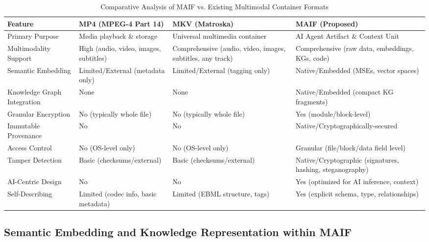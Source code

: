 \documentclass[conference]{IEEEtran}
\begin{document}
\begin{table*}[!t]
\renewcommand{\arraystretch}{1.3}
\caption{Comparative Analysis of MAIF vs. Existing Multimodal Container Formats}
\label{tab:maif-comparison}
\centering
\scriptsize
\begin{tabular}{p{3cm}p{3.5cm}p{3.5cm}p{3.5cm}}
\toprule
\textbf{Feature} & \textbf{MP4 (MPEG-4 Part 14)} & \textbf{MKV (Matroska)} & \textbf{MAIF (Proposed)} \\
\midrule
Primary Purpose & Media playback \& storage\cite{ref35} & Universal multimedia container\cite{ref37} & AI Agent Artifact \& Context Unit \\
Multimodality Support & High (audio, video, images, subtitles)\cite{ref35} & Comprehensive (audio, video, images, subtitles, any track)\cite{ref37} & Comprehensive (raw data, embeddings, KGs, code) \\
Semantic Embedding & Limited/External (metadata only)\cite{ref35} & Limited/External (tagging only)\cite{ref36} & Native/Embedded (MSEs, vector spaces)\cite{ref26} \\
Knowledge Graph Integration & None & None & Native/Embedded (compact KG fragments)\cite{ref42} \\
Granular Encryption & No (typically whole file) & No (typically whole file) & Yes (module/block-level)\cite{ref64} \\
Immutable Provenance & No & No & Native/Cryptographically-secured\cite{ref9} \\
Access Control & No (OS-level only) & No (OS-level only) & Granular (file/block/data field level)\cite{ref69} \\
Tamper Detection & Basic (checksums/external) & Basic (checksums/external) & Native/Cryptographic (signatures, hashing, steganography)\cite{ref71} \\
AI-Centric Design & No & No & Yes (optimized for AI inference, context)\cite{ref74} \\
Self-Describing & Limited (codec info, basic metadata)\cite{ref32} & Limited (EBML structure, tags)\cite{ref36} & Yes (explicit schema, type, relationships)\cite{ref62} \\
\bottomrule
\end{tabular}
\end{table*}

\subsection{Semantic Embedding and Knowledge Representation within MAIF}
\end{document}
